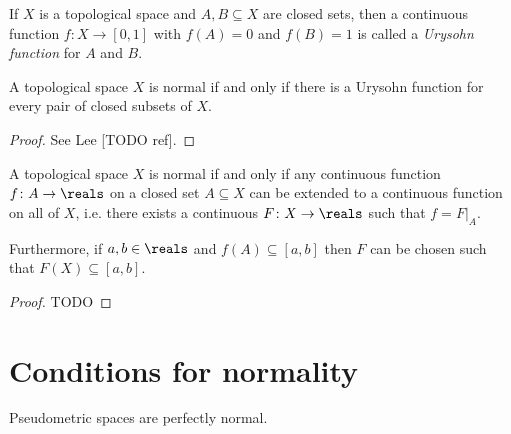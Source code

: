 \documentclass[article, a4paper, 11pt, oneside]{memoir}
\numberwithin{equation}{chapter}
\begin{document}
If $X$ is a topological space and $A,B \subseteq X$ are closed sets, then a continuous function $f \colon X \to [0,1]$ with $f(A) = 0$ and $f(B) = 1$ is called a \emph{Urysohn function} for $A$ and $B$.

\begin{theorem}
    A topological space $X$ is normal if and only if there is a Urysohn function for every pair of closed subsets of $X$.
\end{theorem}

\begin{proof}
    See Lee [TODO ref].
\end{proof}


\begin{theorem}
    \label{thm:Tietze-extension}
    A topological space $X$ is normal if and only if any continuous function $f \colon A \to \reals$ on a closed set $A \subseteq X$ can be extended to a continuous function on all of $X$, i.e. there exists a continuous $F \colon X \to \reals$ such that $f = F|_A$.

    Furthermore, if $a,b \in \reals$ and $f(A) \subseteq [a,b]$ then $F$ can be chosen such that $F(X) \subseteq [a,b]$.
\end{theorem}

\begin{proof}
    TODO
\end{proof}



\section{Conditions for normality}

\begin{proposition}
    \label{thm:metric-space-normal}
    Pseudometric spaces are perfectly normal.
\end{proposition}
\end{document}
